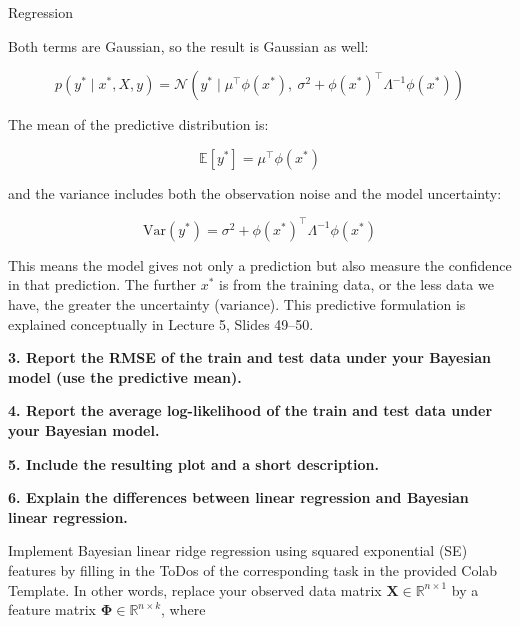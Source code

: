 \documentclass[
	english,
        solution=true
	]{tudaexercise}
\begin{document}
\begin{task}[points=34]{Regression}
\begin{subtask}[points=10, title=Bayesian Linear Regression]
\begin{solution}
            Both terms are Gaussian, so the result is Gaussian as well:
            
            \[
            p(y^* \mid x^*, X, y) = \mathcal{N}(y^* \mid \mu^\top \phi(x^*),\ \sigma^2 + \phi(x^*)^\top \Lambda^{-1} \phi(x^*))
            \]

            The mean of the predictive distribution is:
            
            \[
            \mathbb{E}[y^*] = \mu^\top \phi(x^*)
            \]

            and the variance includes both the observation noise and the model uncertainty:
            
            \[
            \text{Var}(y^*) = \sigma^2 + \phi(x^*)^\top \Lambda^{-1} \phi(x^*)
            \]

            This means the model gives not only a prediction but also measure the confidence in that prediction.
            The further $x^*$ is from the training data, or the less data we have, the greater the uncertainty (variance). This predictive formulation is explained conceptually in Lecture 5, Slides 49–50.
            
            \vspace{2em}

            \textbf{3. Report the RMSE of the train and test data under your Bayesian model (use the predictive mean).}

            \vspace{2em}

            \textbf{4. Report the average log-likelihood of the train and test data under your Bayesian model.}

            \vspace{2em}

            \textbf{5. Include the resulting plot and a short description.}

            \vspace{2em}

            \textbf{6. Explain the differences between linear regression and Bayesian linear regression.}
        \end{solution}
    \end{subtask}

    \begin{subtask}[points=8, title=Squared Exponential Features]
        Implement Bayesian linear ridge regression using squared exponential (SE) features by filling in the ToDos of the corresponding task in the provided Colab Template.
        In other words, replace your observed data matrix $\mathbf{X} \in \mathbb{R}^{n \times 1}$ by a feature matrix $\bm{\Phi} \in \mathbb{R}^{n \times k}$, where


\end{subtask}
\end{task}
\end{document}
